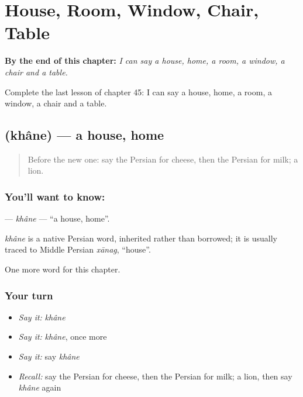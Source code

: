 
\chapter{House, Room, Window, Chair, Table}
\label{ch:fa-house-room-window-chair-table}

\begin{chapteropening}
\textbf{By the end of this chapter:} \emph{I can say a house, home, a room, a window, a chair and a table.}

Complete the last lesson of chapter 45: I can say a house, home, a room, a window, a chair and a table.
\end{chapteropening}

\section[\texorpdfstring{\fa{خانه} (khâne)}{خانه (khâne)}]{ (khâne) — a house, home}

\label{lesson:FA-C45-khane}



\begin{quote}
Before the new one: say the Persian for cheese, then the Persian for milk; a lion.
\end{quote}

\subsection*{You'll want to know: }
\textbf{} — \emph{khâne} — \textquotedblleft{}a house, home\textquotedblright{}.

\begin{cousinweb}
\emph{khâne} is a native Persian word, inherited rather than borrowed; it is usually traced to Middle Persian \emph{xānag}, \textquotedblleft{}house\textquotedblright{}.
\end{cousinweb}

\begin{grammarlens}[title={What you've built}]
One more word for this chapter.
\end{grammarlens}

\subsection*{Your turn}
\begin{itemize}
\raggedright
  \item \emph{Say it:} \emph{khâne}
  \item \emph{Say it:} \emph{khâne}, once more
  \item \emph{Say it:} say \emph{khâne}
  \item \emph{Recall:} say the Persian for cheese, then the Persian for milk; a lion, then say \emph{khâne} again
\end{itemize}

